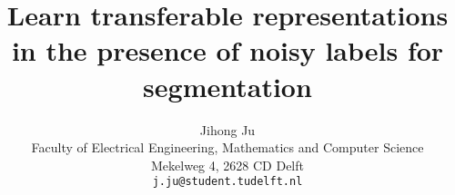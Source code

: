 \documentclass[10pt,twocolumn,letterpaper]{article}
\begin{document}
\onecolumn
{}


\twocolumn
{}
\newpage
\title{Learn transferable representations in the presence of noisy labels for segmentation}

\author{Jihong Ju\\
Faculty of Electrical Engineering, Mathematics and Computer Science \\
Mekelweg 4, 2628 CD Delft\\
{\tt\small j.ju@student.tudelft.nl}
}

\maketitle
\end{document}
